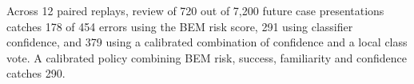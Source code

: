 Across 12 paired replays, review of 720 out of 7,200 future case presentations catches 178 of 454 errors using the BEM risk score, 291 using classifier confidence, and 379 using a calibrated combination of confidence and a local class vote. A calibrated policy combining BEM risk, success, familiarity and confidence catches 290.
